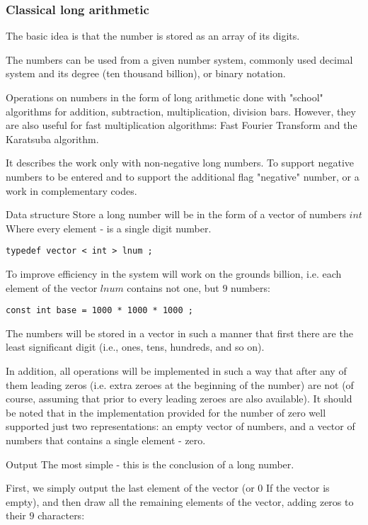 \subsubsection{ Classical long arithmetic }

The basic idea is that the number is stored as an array of its digits.

The numbers can be used from a given number system, commonly used decimal system and its degree (ten thousand billion), or binary notation.

Operations on numbers in the form of long arithmetic done with "school" algorithms for addition, subtraction, multiplication, division bars. However, they are also useful for fast multiplication algorithms: Fast Fourier Transform and the Karatsuba algorithm.

It describes the work only with non-negative long numbers. To support negative numbers to be entered and to support the additional flag "negative" number, or a work in complementary codes.

Data structure
Store a long number will be in the form of a vector of numbers $int$ Where every element - is a single digit number.

\begin{verbatim}
typedef vector < int > lnum ; 
\end{verbatim}
To improve efficiency in the system will work on the grounds billion, i.e. each element of the vector $lnum$ contains not one, but $9$ numbers:

\begin{verbatim}
const int base = 1000 * 1000 * 1000 ; 
\end{verbatim}
The numbers will be stored in a vector in such a manner that first there are the least significant digit (i.e., ones, tens, hundreds, and so on).

In addition, all operations will be implemented in such a way that after any of them leading zeros (i.e. extra zeroes at the beginning of the number) are not (of course, assuming that prior to every leading zeroes are also available). It should be noted that in the implementation provided for the number of zero well supported just two representations: an empty vector of numbers, and a vector of numbers that contains a single element - zero.

Output
The most simple - this is the conclusion of a long number.

First, we simply output the last element of the vector (or $0$ If the vector is empty), and then draw all the remaining elements of the vector, adding zeros to their $9$ characters:

